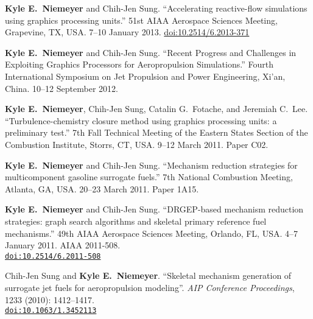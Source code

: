 \documentclass[margin,line,11pt]{res}
\makeatletter
\newlength{\bibhang}
\newlength{\bibsep}
 {\@listi \global\bibsep\itemsep \global\advance\bibsep by\parsep}
\newenvironment{bibenum*}
  {\renewcommand\labelenumi{\theenumi.}%
   \etaremune[
     topsep=0pt,
     itemsep=\bibsep,
     parsep=0pt,partopsep=0pt,
     itemindent=-\bibhang,
     leftmargin={\bibhang+\widthof{[999]}}]}
  {\endetaremune}
\newcommand*{\doi}[1]{\href{http://dx.doi.org/#1}{\nolinkurl{doi:#1}}}
\makeatother
\begin{document}
\begin{resume}
\begin{bibenum*}
\item \textbf{Kyle E.\ Niemeyer} and Chih-Jen Sung.
``Accelerating reactive-flow simulations using graphics processing units.''
51st AIAA Aerospace Sciences Meeting, Grapevine, TX, USA.
7--10 January 2013.
\href{http://arc.aiaa.org/doi/abs/10.2514/6.2013-371}{doi:10.2514/6.2013-371}

\item \textbf{Kyle E.\ Niemeyer} and Chih-Jen Sung.
``Recent Progress and Challenges in Exploiting Graphics Processors for Aeropropulsion Simulations.''
Fourth International Symposium on Jet Propulsion and Power Engineering, Xi'an, China.
10--12 September 2012.

\item \textbf{Kyle E.\ Niemeyer}, Chih-Jen Sung, Catalin G.\ Fotache, and Jeremiah C.\ Lee.
``Turbulence-chemistry closure method using graphics processing units: a preliminary test.''
7th Fall Technical Meeting of the Eastern States Section of the Combustion Institute, Storrs, CT, USA.
9--12 March 2011.
Paper C02.

\item \textbf{Kyle E.\ Niemeyer} and Chih-Jen Sung.
``Mechanism reduction strategies for multicomponent gasoline surrogate fuels.''
7th National Combustion Meeting, Atlanta, GA, USA.
20--23 March 2011.
Paper 1A15.

\item \textbf{Kyle E.\ Niemeyer} and Chih-Jen Sung.
``DRGEP-based mechanism reduction strategies: graph search algorithms and skeletal primary reference fuel mechanisms.''
49th AIAA Aero\-space Sciences Meeting, Orlando, FL, USA.
4--7 January 2011.
AIAA 2011-508. \\
\doi{10.2514/6.2011-508}

\item Chih-Jen Sung and \textbf{Kyle E.\ Niemeyer}.
``Skeletal mechanism generation of surrogate jet fuels for aeropropulsion modeling''.
\emph{AIP Conference Proceedings}, 1233 (2010): 1412--1417. \\
\doi{10.1063/1.3452113}



\end{bibenum*}
\end{resume}
\end{document}
